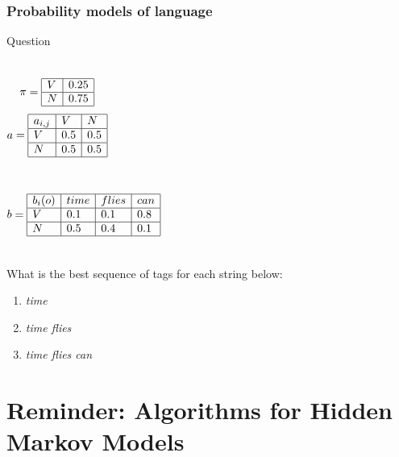 \begin{frame}
\frametitle{Probability models of language}
\centering
\begin{alertblock}{Question}
\begin{columns}[c]
\column{0.5in}
\[ \pi = \begin{array}{|l|l|}
\hline
V & 0.25 \\ \hline
N & 0.75 \\ \hline
\end{array}
\]
\column{0.65in}
\[ a = \begin{array}{|l|l|l|}
\hline
a_{i,j} & V & N \\ \hline
V & 0.5 & 0.5 \\ \hline
N & 0.5 & 0.5 \\ \hline
\end{array}
\]
\end{columns}
\begin{columns}[c]
\column{3in}
\[ b = \begin{array}{|l|l|l|l|}
\hline
b_i(o) & time & flies & can \\ \hline
V & 0.1 & 0.1 & 0.8 \\ \hline
N & 0.5 & 0.4 & 0.1 \\ \hline
\end{array}
\]
\end{columns}
\end{alertblock}
\begin{block}{}
What is the best sequence of tags for each string below:
\begin{enumerate}
\item \textit{time}
\item \textit{time flies}
\item \textit{time flies can}
\end{enumerate}

\end{block}

\end{frame}


\section{Reminder: Algorithms for Hidden Markov Models}

